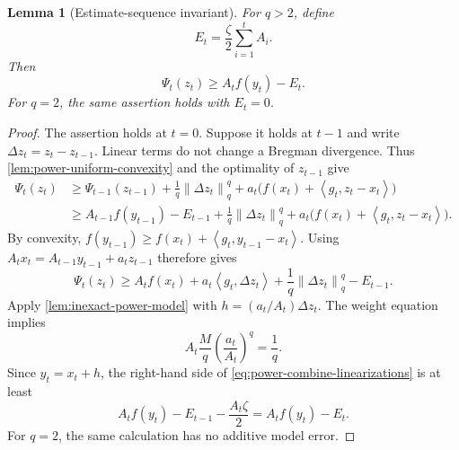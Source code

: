 \documentclass[11pt]{article}
\newcommand{\ip}[2]{\left\langle #1,#2\right\rangle}
\newcommand{\norm}[2]{\left\lVert #1\right\rVert_{#2}}
\newtheorem{lemma}[lemma]{Lemma}
\theoremstyle{definition}
\theoremstyle{remark}
\begin{document}
\begin{lemma}[Estimate-sequence invariant]
\label{lem:power-invariant}
For $q>2$, define
\begin{equation}
\label{eq:power-error-accumulation}
 E_t=\frac\zeta2\sum_{i=1}^t A_i.
\end{equation}
Then
\begin{equation}
\label{eq:power-invariant}
 \Psi_t(z_t)\ge A_t f(y_t)-E_t.
\end{equation}
For $q=2$, the same assertion holds with $E_t=0$.
\end{lemma}

\begin{proof}
The assertion holds at $t=0$.  Suppose it holds at $t-1$ and write
$\Delta z_t=z_t-z_{t-1}$.
Linear terms do not change a Bregman divergence.  Thus
\cref{lem:power-uniform-convexity} and the optimality of $z_{t-1}$ give
\begin{align*}
 \Psi_t(z_t)
 &\ge\Psi_{t-1}(z_{t-1})+\frac1q\norm{\Delta z_t}{q}^q
       +a_t\bigl(f(x_t)+\ip{g_t}{z_t-x_t}\bigr)\\
 &\ge A_{t-1}f(y_{t-1})-E_{t-1}
       +\frac1q\norm{\Delta z_t}{q}^q
       +a_t\bigl(f(x_t)+\ip{g_t}{z_t-x_t}\bigr).
\end{align*}
By convexity,
$f(y_{t-1})\ge f(x_t)+\ip{g_t}{y_{t-1}-x_t}$.
Using $A_t x_t=A_{t-1}y_{t-1}+a_tz_{t-1}$ therefore gives
\begin{equation}
\label{eq:power-combine-linearizations}
 \Psi_t(z_t)\ge A_t f(x_t)+a_t\ip{g_t}{\Delta z_t}
                    +\frac1q\norm{\Delta z_t}{q}^q-E_{t-1}.
\end{equation}
Apply \cref{lem:inexact-power-model} with
$h=(a_t/A_t)\Delta z_t$.  The weight equation implies
\[
 A_t\frac Mq\left(\frac{a_t}{A_t}\right)^q=\frac1q.
\]
Since $y_t=x_t+h$, the right-hand side of
\cref{eq:power-combine-linearizations} is at least
\[
 A_t f(y_t)-E_{t-1}-\frac{A_t\zeta}{2}
 =A_t f(y_t)-E_t.
\]
For $q=2$, the same calculation has no additive model error.
\end{proof}
\end{document}
